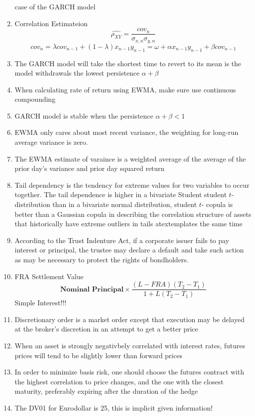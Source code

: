 \documentclass[11pt,fleqn]{book} %
\numberwithin{equation}{section} %
\numberwithin{figure}{section} %
\numberwithin{table}{section} %
\begin{document}
\begin{enumerate}
    case of the GARCH model
    \item Correlation Estimateion
    $$
    \hat{\rho_{XY}}=\frac{cov_n}{\sigma_{x,n}\sigma_{y,n}}
    $$
    $$
    cov_n=\lambda cov_{n-1}+(1-\lambda)x_{n-1}y_{n-1}=\omega+\alpha x_{n-1}y_{n-1}+\beta cov_{n-1}
    $$
    \item The GARCH model will take the shortest time to revert to its mean is the model withdrawals
    the lowest persistence $\alpha+\beta$
    \item When calculating rate of return using EWMA, make sure use continuous compounding
    \item GARCH model is stable when the persistence $\alpha+\beta<1$
    \item EWMA only cares about most recent variance, the weighting for long-run average variance
    is zero.
    \item The EWMA estimate of varaince is a weighted average of the average of the prior
    day's variance and prior day squared return
    \item Tail dependency is the tendency for extreme values for two variables
    to occur together. The tail dependence is higher in a bivariate Student
    student $t$-distribution than in a bivariate normal distribution, student $t$-
    copula is better than a Gaussian copula in describing the correlation
    structure of assets that historically have extreme outliers in tails atextemplates
    the same time
    \item According to the Trust Indenture Act, if a corporate issuer fails to pay
    interest or principal, the trustee may declare a default and take such
    action as may be necessary to protect the rights of bondholders.
    \item FRA Settlement Value
    $$
    \textbf{Nominal Principal}\times\frac{(L-FRA)(T_2-T_1)}{1+L(T_2-T_1)}
    $$
    Simple Interest!!!
    \item Discretionary order is a market order except that execution may be delayed
    at the broker's discretion in an attempt to get a better price
    \item When an asset is strongly negativbely correlated with interest rates, futures prices will
    tend to be slightly lower than forward prices
    \item In order to minimize basis risk, one should choose the futures contract
    with the highest correlation to price changes, and the one with the closest
    maturity, preferably expiring after the duration of the hedge
    \item The DV01 for Eurodollar is 25, this is implicit given information!
\end{enumerate}
 
 
 
 
 
 
 
 
\end{document}
